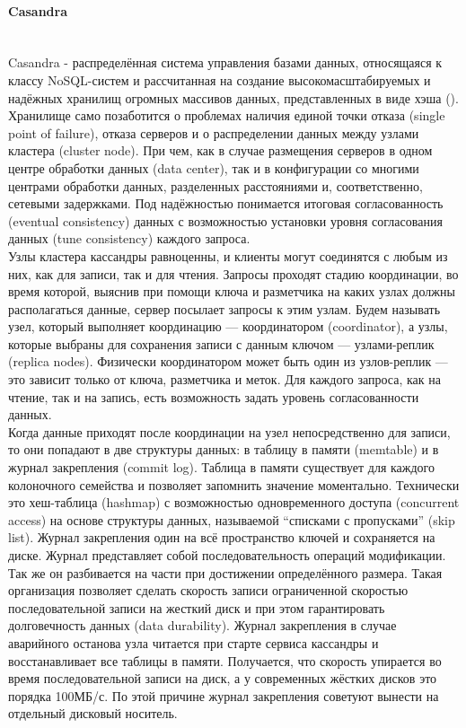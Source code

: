 \paragraph{Casandra}~\\
Casandra - распределённая система управления базами данных, относящаяся к классу NoSQL-систем и рассчитанная на создание высокомасштабируемых и надёжных хранилищ огромных массивов данных, представленных в виде хэша (\autocite{casandra}). \\
Хранилище само позаботится о проблемах наличия единой точки отказа (single point of failure), отказа серверов и о распределении данных между узлами кластера (cluster node). При чем, как в случае размещения серверов в одном центре обработки данных (data center), так и в конфигурации со многими центрами обработки данных, разделенных расстояниями и, соответственно, сетевыми задержками. Под надёжностью понимается итоговая согласованность (eventual consistency) данных с возможностью установки уровня согласования данных (tune consistency) каждого запроса. \\
Узлы кластера кассандры равноценны, и клиенты могут соединятся с любым из них, как для записи, так и для чтения. Запросы проходят стадию координации, во время которой, выяснив при помощи ключа и разметчика на каких узлах должны располагаться данные, сервер посылает запросы к этим узлам. Будем называть узел, который выполняет координацию — координатором (coordinator), а узлы, которые выбраны для сохранения записи с данным ключом — узлами-реплик (replica nodes). Физически координатором может быть один из узлов-реплик — это зависит только от ключа, разметчика и меток.
Для каждого запроса, как на чтение, так и на запись, есть возможность задать уровень согласованности данных. \\
Когда данные приходят после координации на узел непосредственно для записи, то они попадают в две структуры данных: в таблицу в памяти (memtable) и в журнал закрепления (commit log). Таблица в памяти существует для каждого колоночного семейства и позволяет запомнить значение моментально. Технически это хеш-таблица (hashmap) с возможностью одновременного доступа (concurrent access) на основе структуры данных, называемой “списками с пропусками” (skip list). Журнал закрепления один на всё пространство ключей и сохраняется на диске. Журнал представляет собой последовательность операций модификации. Так же он разбивается на части при достижении определённого размера.
Такая организация позволяет сделать скорость записи ограниченной скоростью последовательной записи на жесткий диск и при этом гарантировать долговечность данных (data durability). Журнал закрепления в случае аварийного останова узла читается при старте сервиса кассандры и восстанавливает все таблицы в памяти. Получается, что скорость упирается во время последовательной записи на диск, а у современных жёстких дисков это порядка 100МБ/с. По этой причине журнал закрепления советуют вынести на отдельный дисковый носитель.

